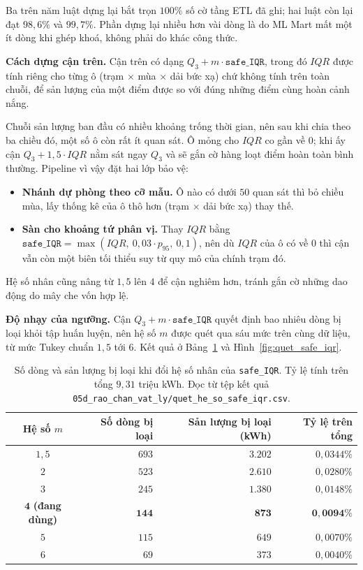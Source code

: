 \documentclass[12pt, a4paper]{report}
\begin{document}
Ba trên năm luật dựng lại bắt trọn $100\%$ số cờ tầng ETL đã ghi; hai luật còn lại đạt
$98{,}6\%$ và $99{,}7\%$. Phần dựng lại nhiều hơn vài dòng là do ML Mart mất một ít dòng khi
ghép khoá, không phải do khác công thức.

\textbf{Cách dựng cận trên.} Cận trên có dạng $Q_3 + m \cdot \texttt{safe\_IQR}$, trong đó
$IQR$ được tính riêng cho từng ô (trạm $\times$ mùa $\times$ dải bức xạ) chứ không
tính trên toàn chuỗi, để sản lượng của một điểm được so với đúng những điểm cùng hoàn cảnh
nắng.

Chuỗi sản lượng ban đầu có nhiều khoảng trống thời gian, nên sau khi chia theo ba chiều đó,
một số ô còn rất ít quan sát. Ô mỏng cho $IQR$ co gần về $0$; khi ấy cận
$Q_3 + 1{,}5 \cdot IQR$ nằm sát ngay $Q_3$ và sẽ gắn cờ hàng loạt điểm hoàn toàn bình
thường. Pipeline vì vậy đặt hai lớp bảo vệ:

\begin{itemize}
    \item \textbf{Nhánh dự phòng theo cỡ mẫu.} Ô nào có dưới $50$ quan sát thì bỏ chiều mùa,
    lấy thống kê của ô thô hơn (trạm $\times$ dải bức xạ) thay thế.
    \item \textbf{Sàn cho khoảng tứ phân vị.} Thay $IQR$ bằng
    $\texttt{safe\_IQR} = \max(IQR,\ 0{,}03 \cdot p_{95},\ 0{,}1)$, nên dù $IQR$ của ô có về
    $0$ thì cận vẫn còn một biên tối thiểu suy từ quy mô của chính trạm đó.
\end{itemize}

Hệ số nhân cũng nâng từ $1{,}5$ lên $4$ để cận nghiêm hơn, tránh gắn cờ những dao động do
mây che vốn hợp lệ.

\textbf{Độ nhạy của ngưỡng.} Cận $Q_3 + m \cdot \texttt{safe\_IQR}$ quyết định bao nhiêu
dòng bị loại khỏi tập huấn luyện, nên hệ số $m$ được quét qua sáu mức trên cùng dữ liệu,
từ mức Tukey chuẩn $1{,}5$ tới $6$. Kết quả ở Bảng~\ref{tab:quet_safe_iqr} và
Hình~\ref{fig:quet_safe_iqr}.

\begin{table}[htbp]
\centering
\caption{Số dòng và sản lượng bị loại khi đổi hệ số nhân của \texttt{safe\_IQR}. Tỷ lệ tính
trên tổng $9{,}31$ triệu kWh. Đọc từ tệp kết quả
\texttt{05d\_rao\_chan\_vat\_ly/quet\_he\_so\_safe\_iqr.csv}.}
\label{tab:quet_safe_iqr}
\small
\begin{tabular}{c r r r}
\toprule
\textbf{Hệ số $m$} & \textbf{Số dòng bị loại} & \textbf{Sản lượng bị loại (kWh)} & \textbf{Tỷ lệ trên tổng} \\
\midrule
$1{,}5$ & $693$ & $3.202$ & $0{,}0344\%$ \\
$2$     & $523$ & $2.610$ & $0{,}0280\%$ \\
$3$     & $245$ & $1.380$ & $0{,}0148\%$ \\
$\mathbf{4}$ \textbf{(đang dùng)} & $\mathbf{144}$ & $\mathbf{873}$ & $\mathbf{0{,}0094\%}$ \\
$5$     & $115$ & $649$   & $0{,}0070\%$ \\
$6$     & $69$  & $373$   & $0{,}0040\%$ \\
\bottomrule
\end{tabular}
\end{table}
\end{document}
